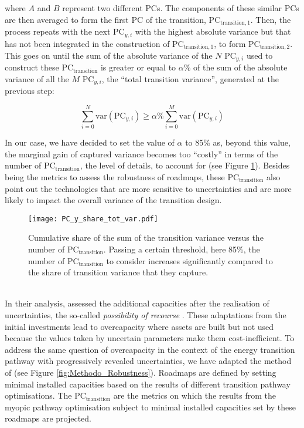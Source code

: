 \noindent
where $A$ and $B$ represent two different PCs.  The components of these similar PCs are then averaged to form the first PC of the transition, $\text{PC}_{\text{transition},1}$. Then, the process repeats with the next $\text{PC}_{y,i}$ with the highest absolute variance but that has not been integrated in the construction of $\text{PC}_{\text{transition},1}$, to form $\text{PC}_{\text{transition},2}$. This goes on until the sum of the absolute variance of the $N$ $\text{PC}_{y,i}$ used to construct these $\text{PC}_{\text{transition}}$ is greater or equal to $\alpha$\% of the sum of the absolute variance of all the $M$ $\text{PC}_{y,i}$, \ie the ``total transition variance'', generated at the previous step:

\begin{equation}
\label{eq:PC_transition}
\sum_{i=0}^N\text{var}\left(\text{PC}_{y,i}\right)\geq \alpha\% \sum_{i=0}^M\text{var}\left(\text{PC}_{y,i}\right)
\end{equation}

In our case, we have decided to set the value of $\alpha$ to 85\% as, beyond this value, the marginal gain of captured variance becomes too ``costly'' in terms of the number of $\text{PC}_{\text{transition}}$, \ie the level of details, to account for (see Figure \ref{fig:PC_y_share_tot_var}).  Besides being the metrics to assess the robustness of roadmaps, these $\text{PC}_{\text{transition}}$ also point out the technologies that are more sensitive to uncertainties and are more likely to impact the overall variance of the transition design.

\begin{figure}[!htbp]
\centering
\texttt{[image: PC\_y\_share\_tot\_var.pdf]}
\caption{Cumulative share of the sum of the transition variance versus the number of $\text{PC}_{\text{transition}}$. Passing a certain threshold, here 85\%, the number of $\text{PC}_{\text{transition}}$ to consider increases significantly compared to the share of transition variance that they capture.}
\label{fig:PC_y_share_tot_var}
\end{figure}

\newpage
{}\\

\noindent
In their analysis, \citet{moret2020overcapacity} assessed the additional capacities after the realisation of uncertainties, the so-called \textit{possibility of recourse} \cite{grossmann2016recent}. These adaptations from the initial investments lead to overcapacity where assets are built but not used because the values taken by uncertain parameters make them cost-inefficient. To address the same question of overcapacity in the context of the energy transition pathway with progressively revealed uncertainties, we have adapted the method of \citet{moret2020overcapacity} (see Figure \ref{fig:Methodo_Robustness}). Roadmaps are defined by setting minimal installed capacities based on the results of different transition pathway optimisations. The $\text{PC}_{\text{transition}}$ are the metrics on which the results from the myopic pathway optimisation subject to minimal installed capacities set by these roadmaps are projected. 

